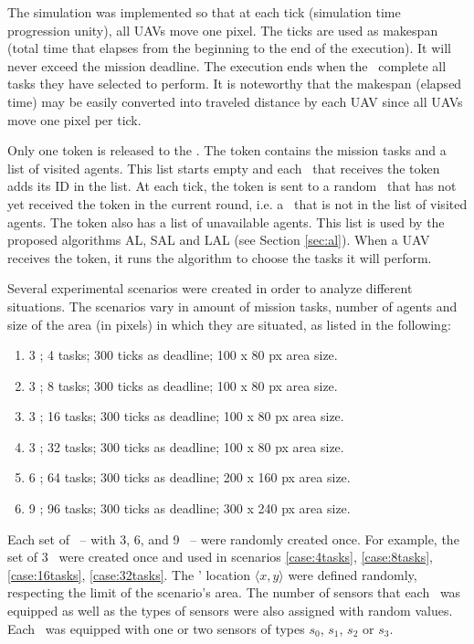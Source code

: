 The simulation was implemented so that at each tick (simulation time progression unity), all UAVs move one pixel. 
The ticks are used as makespan (total time that elapses from the beginning to the end of the execution). It will never exceed the mission deadline. The execution ends when the \uavs\ complete all tasks they have selected to perform.
It is noteworthy that the makespan (elapsed time) may be easily converted into traveled distance by each UAV since all UAVs move one pixel per tick.

Only one token is released to the \uavs. The token contains the mission tasks and a list of visited agents. This list starts empty and each \uav\ that receives the token adds its ID in the list. At each tick, the token is sent to a random \uav\ that has not yet received the token in the current round, i.e. a \uav\ that is not in the list of visited agents. The token also has a list of unavailable agents. This list is used by the proposed algorithms AL, SAL and LAL (see Section \ref{sec:al}).
When a UAV receives the token, it runs the algorithm to choose the tasks it will perform. 

Several experimental scenarios were created in order to analyze different situations. The scenarios vary in amount of mission tasks, number of agents and size of the area (in pixels) in which they are situated, as listed in the following:

\begin{enumerate}
	\item 3 \uavs; 4 tasks; 300 ticks as deadline; 100 x 80 px area size. \label{case:4tasks}
	\item 3 \uavs; 8 tasks; 300 ticks as deadline; 100 x 80 px area size. \label{case:8tasks}
	\item 3 \uavs; 16 tasks; 300 ticks as deadline; 100 x 80 px area size. \label{case:16tasks}
	\item 3 \uavs; 32 tasks; 300 ticks as deadline; 100 x 80 px area size. \label{case:32tasks}
	\item 6 \uavs; 64 tasks; 300 ticks as deadline; 200 x 160 px area size. \label{case:64tasks}
	\item 9 \uavs; 96 tasks; 300 ticks as deadline; 300 x 240 px area size. \label{case:96tasks}
\end{enumerate}

Each set of \uavs\ -- with 3, 6, and 9 \uavs\ -- were randomly created once. For example, the set of 3 \uavs\ were created once and used in scenarios \ref{case:4tasks}, \ref{case:8tasks}, \ref{case:16tasks}, \ref{case:32tasks}. 
The \uavs' location $\langle x,y \rangle$ were defined randomly, respecting the limit of the scenario's area.
The number of sensors that each \uav\ was equipped as well as the types of sensors were also assigned with random values. Each \uav\ was equipped with one or two sensors of types $s_0$, $s_1$, $s_2$ or $s_3$.

